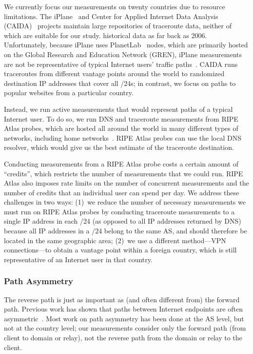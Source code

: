 We currently focus our measurements on twenty countries due to resource limitations.
The iPlane~\cite{madhyastha2006iplane} and Center for Applied Internet Data
Analysis (CAIDA)~\cite{caida} projects maintain large repositories of
traceroute data, neither of which are suitable for our study.   %
historical data as far back as 2006. Unfortunately, because iPlane uses
PlanetLab~\cite{PlanetLab} nodes, which are primarily hosted on the Global
Research and Education Network (GREN), iPlane measurements are not be
representative of typical Internet users' traffic
paths~\cite{banerjee2004interdomain}.  CAIDA runs traceroutes from different
vantage points around the world to randomized destination IP addresses that
cover all /24s; in contrast, we focus on paths to popular websites from a
particular country.

Instead, we run active measurements that
would represent paths of a typical Internet user. To do so, we run
DNS and traceroute measurements from RIPE Atlas probes, which are hosted
all around the world in many different types of networks, including home
networks~\cite{ripe_atlas}.  RIPE Atlas probes can use the local DNS
resolver, which would give us the best estimate of the traceroute
destination.

Conducting measurements from a RIPE Atlas probe costs a certain
amount of ``credits'', which restricts the number of measurements that we
could run.  RIPE Atlas also imposes rate limits on the number of
concurrent measurements and the number of credits that an individual
user can spend per day.  We address these challenges in two ways: (1)~we
reduce the number of necessary measurements we must run on RIPE Atlas
probes by conducting traceroute measurements to a single IP address in
each /24 (as opposed to all IP addresses returned by DNS) because all IP
addresses in a /24 belong to the same AS, and should therefore be
located in the same geographic area; (2)~we use a different method---VPN
connections---to obtain a vantage point within a foreign country, which
is still representative of an Internet user in that country.

\subsubsection{Path Asymmetry}
\label{path_sym}

The reverse path is just as important as (and often different from) the
forward path.   Previous work has shown that paths between Internet endpoints
are often asymmetric~\cite{he2005routing}.  Most work on path asymmetry has
been done at the AS level, but not at the country level; our measurements
consider only the forward path (from client to domain or relay), not the
reverse path from the domain or relay to the client.

